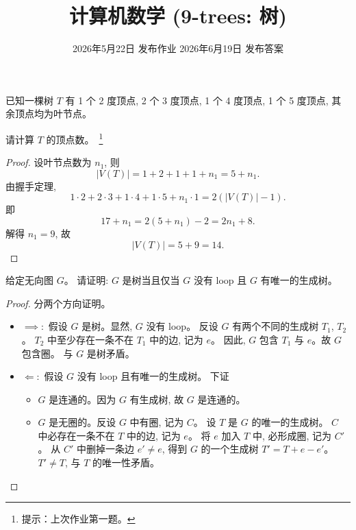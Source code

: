 \documentclass[a4paper, justified]{tufte-handout}
\title{计算机数学 (9-trees: 树)}
\date{2026年5月22日 发布作业 \qquad 2026年6月19日 发布答案}
\begin{document}
\maketitle
\noplagiarism %
\begin{abstract}
\end{abstract}
\beginrequired

\begin{problem}[树的顶点度数]
  已知一棵树 $T$ 有 1 个 2 度顶点,
  2 个 3 度顶点, 1 个 4 度顶点, 1 个 5 度顶点,
  其余顶点均为叶节点。

  \noindent 请计算 $T$ 的顶点数。~\footnote{
    提示：上次作业第一题。
  }
\end{problem}

\begin{proof}
  设叶节点数为 $n_1$, 则
  \[
    |V(T)| = 1 + 2 + 1 + 1 + n_1 = 5 + n_1.
  \]
  由握手定理,
  \[
    1 \cdot 2 + 2 \cdot 3 + 1 \cdot 4 + 1 \cdot 5 + n_1 \cdot 1 = 2(|V(T)| - 1).
  \]
  即
  \[
    17 + n_1 = 2(5 + n_1) - 2 = 2n_1 + 8.
  \]
  解得 $n_1 = 9$, 故
  \[
    |V(T)| = 5 + 9 = 14.
  \]
\end{proof}

\begin{problem}[树的刻画]
  给定无向图 $G$。
  请证明: $G$ 是树当且仅当 $G$ 没有 loop 且 $G$ 有唯一的生成树。
\end{problem}

\begin{proof}
  分两个方向证明。
  \begin{itemize}
    \item $\implies:$ 假设 $G$ 是树。显然, $G$ 没有 loop。
      反设 $G$ 有两个不同的生成树 $T_{1}$, $T_{2}$。
      $T_{2}$ 中至少存在一条不在 $T_{1}$ 中的边, 记为 $e$。
      因此, $G$ 包含 $T_{1}$ 与 $e$。故 $G$ 包含圈。
      与 $G$ 是树矛盾。
    \item $\Longleftarrow:$ 假设 $G$ 没有 loop 且有唯一的生成树。
      下证
      \begin{itemize}
        \item $G$ 是连通的。因为 $G$ 有生成树, 故 $G$ 是连通的。
        \item $G$ 是无圈的。反设 $G$ 中有圈, 记为 $C$。
          设 $T$ 是 $G$ 的唯一的生成树。
          $C$ 中必存在一条不在 $T$ 中的边, 记为 $e$。
          将 $e$ 加入 $T$ 中, 必形成圈, 记为 $C'$。
          从 $C'$ 中删掉一条边 $e' \neq e$,
          得到 $G$ 的一个生成树 $T' = T + e - e'$。
          $T' \neq T$, 与 $T$ 的唯一性矛盾。
      \end{itemize}
  \end{itemize}
\end{proof}
\end{document}
